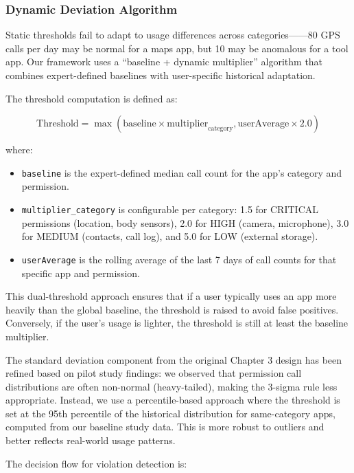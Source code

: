 \subsubsection{Dynamic Deviation Algorithm}

Static thresholds fail to adapt to usage differences across categories——80 GPS calls per day may be normal for a maps app, but 10 may be anomalous for a tool app. Our framework uses a ``baseline + dynamic multiplier'' algorithm that combines expert-defined baselines with user-specific historical adaptation.

The threshold computation is defined as:

\[
\text{Threshold} = \max( \text{baseline} \times \text{multiplier}_{\text{category}}, \text{userAverage} \times 2.0 )
\]

where:
\begin{itemize}
\item \texttt{baseline} is the expert-defined median call count for the app's category and permission.
\item \texttt{multiplier\_category} is configurable per category: 1.5 for CRITICAL permissions (location, body sensors), 2.0 for HIGH (camera, microphone), 3.0 for MEDIUM (contacts, call log), and 5.0 for LOW (external storage).
\item \texttt{userAverage} is the rolling average of the last 7 days of call counts for that specific app and permission.
\end{itemize}

This dual-threshold approach ensures that if a user typically uses an app more heavily than the global baseline, the threshold is raised to avoid false positives. Conversely, if the user's usage is lighter, the threshold is still at least the baseline multiplier.

The standard deviation component from the original Chapter 3 design has been refined based on pilot study findings: we observed that permission call distributions are often non-normal (heavy-tailed), making the 3-sigma rule less appropriate. Instead, we use a percentile-based approach where the threshold is set at the 95th percentile of the historical distribution for same-category apps, computed from our baseline study data. This is more robust to outliers and better reflects real-world usage patterns.

The decision flow for violation detection is:

